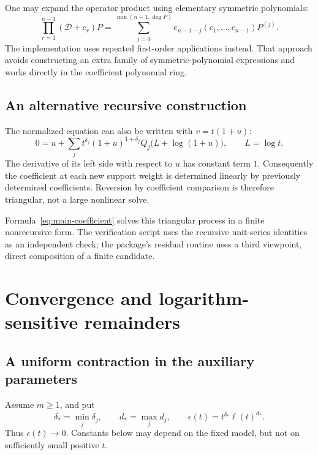 \documentclass[11pt,a4paper]{article}
\numberwithin{equation}{section}
\theoremstyle{definition}
\newcommand{\D}{\mathcal D}
\newcommand{\degree}{\operatorname{deg}}
\begin{document}
One may expand the operator product using elementary symmetric
polynomials:
\begin{equation}\label{eq:operator-symmetric}
 \prod_{r=1}^{n-1}(\D+c_r)P
 =\sum_{j=0}^{\min(n-1,\degree P)}
    e_{n-1-j}(c_1,\ldots,c_{n-1})P^{(j)}.
\end{equation}
The implementation uses repeated first-order applications instead.
That approach avoids constructing an extra family of symmetric-polynomial
expressions and works directly in the coefficient polynomial ring.

\subsection{An alternative recursive construction}
The normalized equation can also be written with $v=t(1+u)$:
\begin{equation}\label{eq:unit-equation}
 0=u+\sum_jt^{\delta_j}(1+u)^{1+\delta_j}
                  Q_j\bigl(L+\log(1+u)\bigr),\qquad L=\log t.
\end{equation}
The derivative of its left side with respect to $u$ has constant term
$1$. Consequently the coefficient at each new support weight is determined
linearly by previously determined coefficients. Reversion by coefficient
comparison is therefore triangular, not a large nonlinear solve.

Formula~\eqref{eq:main-coefficient} solves this triangular process in a
finite nonrecursive form. The verification script uses the recursive
unit-series identities as an independent check; the package's residual
routine uses a third viewpoint, direct composition of a finite candidate.

\section{Convergence and logarithm-sensitive remainders}\label{sec:convergence}

\subsection{A uniform contraction in the auxiliary parameters}
Assume $m\ge1$, and put
\begin{equation}\label{eq:epsilon}
 \delta_* =\min_j\delta_j,\qquad d_* =\max_jd_j,\qquad
 \epsilon(t)=t^{\delta_*}\ell(t)^{d_*}.
\end{equation}
Thus $\epsilon(t)\to0$. Constants below may depend on the fixed model,
but not on sufficiently small positive $t$.
\end{document}
